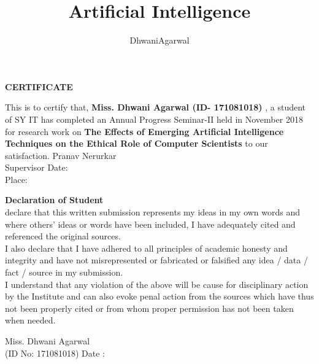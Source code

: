 \documentclass[a4paper,12pt,oneside]{report}
\begin{document}
\title{%
Artificial Intelligence %
}
\let \listoftables \relax
\author{DhwaniAgarwal}

\normallinespacing
\maketitle

\newpage
\begin{center}
    \vfill
    \textbf{\Large{CERTIFICATE}} \\
    \vspace*{\fill}


    This is to certify that, \textbf{Miss. Dhwani Agarwal (ID- 171081018)} ,
a student of SY IT has completed an Annual Progress Seminar-II held
in November 2018 for research work on \textbf{The Effects of Emerging Artificial Intelligence Techniques on the Ethical Role of Computer Scientists} to our satisfaction.
    \vspace*{\fill}
    \vfill
    Pranav Nerurkar \\
Supervisor
\vfill
Date:\\
Place:
\end{center}

\newpage
\begin{center}
    \textbf{\Large{Declaration of Student}} \\
    \vspace{7mm}
    declare that this written submission represents my ideas in my own words and where others' ideas or words have been included, I have adequately cited and referenced the original sources.\\
    \smallskip
    \vspace{5mm}
    I also declare that I have adhered to all principles of academic honesty and integrity and have not misrepresented or fabricated or falsified any idea / data / fact / source in my submission.\\
    \smallskip
    \vspace{5mm}
    I understand that any violation of the above will be cause for disciplinary action by the Institute and can also evoke penal action from the sources which have thus not been properly cited or from whom proper permission has not been taken when needed.
     
    
\end{center}
\vfill
    Miss. Dhwani Agarwal \\ (ID No: 171081018) \hfill Date :\underline{\hspace{1.5in}}
\end{document}
